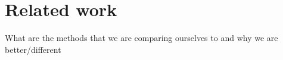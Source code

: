 \section{Related work}
What are the methods that we are comparing ourselves to and why we are better/different
